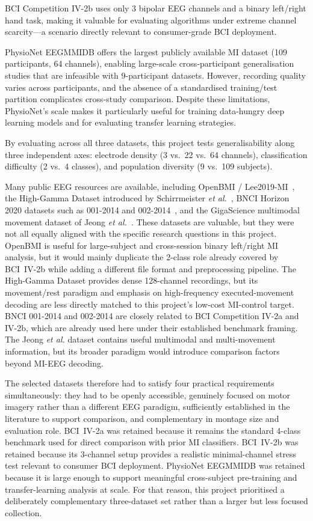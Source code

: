 \documentclass[12pt, a4paper]{article}
\begin{document}
BCI Competition IV-2b uses only 3 bipolar EEG channels and a binary left/right hand task, making it valuable for evaluating algorithms under extreme channel scarcity---a scenario directly relevant to consumer-grade BCI deployment.

PhysioNet EEGMMIDB offers the largest publicly available MI dataset (109 participants, 64 channels), enabling large-scale cross-participant generalisation studies that are infeasible with 9-participant datasets. However, recording quality varies across participants, and the absence of a standardised training/test partition complicates cross-study comparison. Despite these limitations, PhysioNet's scale makes it particularly useful for training data-hungry deep learning models and for evaluating transfer learning strategies.

By evaluating across all three datasets, this project tests generalisability along three independent axes: electrode density (3 vs.\ 22 vs.\ 64 channels), classification difficulty (2 vs.\ 4 classes), and population diversity (9 vs.\ 109 subjects).

Many public EEG resources are available, including OpenBMI / Lee2019-MI~\cite{lee2019openbmi}, the High-Gamma Dataset introduced by Schirrmeister \emph{et al.}~\cite{schirrmeister2017deep}, BNCI Horizon 2020 datasets such as 001-2014 and 002-2014~\cite{bnci2020datasets}, and the GigaScience multimodal movement dataset of Jeong \emph{et al.}~\cite{jeong2020multimodal}. These datasets are valuable, but they were not all equally aligned with the specific research questions in this project. OpenBMI is useful for large-subject and cross-session binary left/right MI analysis, but it would mainly duplicate the 2-class role already covered by BCI~IV-2b while adding a different file format and preprocessing pipeline. The High-Gamma Dataset provides dense 128-channel recordings, but its movement/rest paradigm and emphasis on high-frequency executed-movement decoding are less directly matched to this project's low-cost MI-control target. BNCI 001-2014 and 002-2014 are closely related to BCI Competition IV-2a and IV-2b, which are already used here under their established benchmark framing. The Jeong \emph{et al.} dataset contains useful multimodal and multi-movement information, but its broader paradigm would introduce comparison factors beyond MI-EEG decoding.

The selected datasets therefore had to satisfy four practical requirements simultaneously: they had to be openly accessible, genuinely focused on motor imagery rather than a different EEG paradigm, sufficiently established in the literature to support comparison, and complementary in montage size and evaluation role. BCI~IV-2a was retained because it remains the standard 4-class benchmark used for direct comparison with prior MI classifiers. BCI~IV-2b was retained because its 3-channel setup provides a realistic minimal-channel stress test relevant to consumer BCI deployment. PhysioNet EEGMMIDB was retained because it is large enough to support meaningful cross-subject pre-training and transfer-learning analysis at scale. For that reason, this project prioritised a deliberately complementary three-dataset set rather than a larger but less focused collection.
\end{document}
